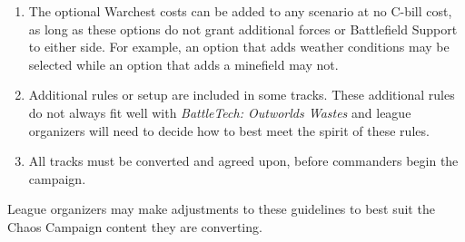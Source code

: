 \begin{enumerate}
\item The optional Warchest costs can be added to any scenario at no C-bill cost, as long as these options do not grant additional forces or Battlefield Support to either side.
For example, an option that adds weather conditions may be selected while an option that adds a minefield may not.

\item Additional rules or setup are included in some tracks.
These additional rules do not always fit well with \emph{BattleTech: Outworlds Wastes} and league organizers will need to decide how to best meet the spirit of these rules.

\item All tracks must be converted and agreed upon, before commanders begin the campaign.

\end{enumerate}

League organizers may make adjustments to these guidelines to best suit the Chaos Campaign content they are converting.
